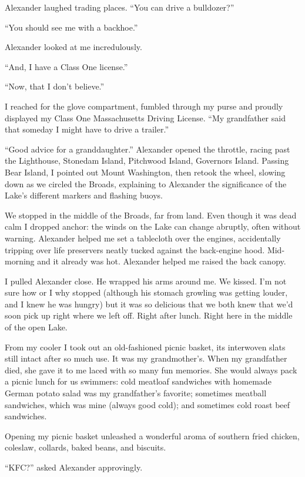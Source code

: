 Alexander laughed trading places. ``You can drive a bulldozer?''

``You should see me with a backhoe.''

Alexander looked at me incredulously.

``And, I have a Class One license.''

``Now, that I don't believe.''

I reached for the glove compartment, fumbled through my purse and
proudly displayed my Class One Massachusetts Driving License. ``My
grandfather said that someday I might have to drive a trailer.''

``Good advice for a granddaughter.'' Alexander opened the throttle,
racing past the Lighthouse, Stonedam Island, Pitchwood Island, Governors
Island. Passing Bear Island, I pointed out Mount Washington, then retook
the wheel, slowing down as we circled the Broads, explaining to
Alexander the significance of the Lake's different markers and flashing
buoys.

We stopped in the middle of the Broads, far from land. Even though it
was dead calm I dropped anchor: the winds on the Lake can change
abruptly, often without warning. Alexander helped me set a tablecloth
over the engines, accidentally tripping over life preservers neatly
tucked against the back-engine hood. Mid-morning and it already was hot.
Alexander helped me raised the back canopy.

I pulled Alexander close. He wrapped his arms around me. We kissed. I'm
not sure how or I why stopped (although his stomach growling was getting
louder, and I knew he was hungry) but it was so delicious that we both
knew that we'd soon pick up right where we left off. Right after lunch.
Right here in the middle of the open Lake.

From my cooler I took out an old-fashioned picnic basket, its interwoven
slats still intact after so much use. It was my grandmother's. When my
grandfather died, she gave it to me laced with so many fun memories. She
would always pack a picnic lunch for us swimmers: cold meatloaf
sandwiches with homemade German potato salad was my grandfather's
favorite; sometimes meatball sandwiches, which was mine (always good
cold); and sometimes cold roast beef sandwiches.

Opening my picnic basket unleashed a wonderful aroma of southern fried
chicken, coleslaw, collards, baked beans, and biscuits.

``KFC?'' asked Alexander approvingly.

